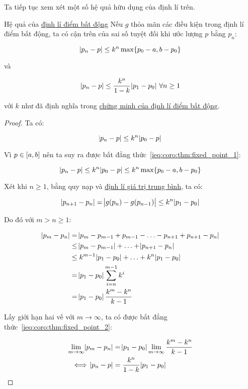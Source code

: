 \documentclass[../../Lectures]{subfiles}
\begin{document}
Ta tiếp tục xem xét một số hệ quả hữu dụng của định lí trên.

\begin{ccoro}{Hệ quả của \hyperref[thm:fixed_point]{định lí điểm bất động}}{}
    Nếu \(g\) thỏa mãn các điều kiện trong định lí điểm bất động, ta có cận trên
    của sai số tuyệt đối khi ước lượng \(p\) bằng \(p_n\):

    \begin{equation}\label{ieq:coro:thm:fixed_point_1}
        \abs{p_n - p} \leq k^n \max \{p_0 - a, b - p_0\}
    \end{equation}

    và

    \begin{equation}\label{ieq:coro:thm:fixed_point_2}
        \abs{p_n - p} \leq \frac{k^n}{1 - k} \abs{p_1 - p_0} \, \forall n \geq 1
    \end{equation}

    với \(k\) như đã định nghĩa trong \hyperref[proof:thm:fixed_point]{chứng
    minh của định lí điểm bất động}.
\end{ccoro}

\begin{proof}
    Ta có:

    \[\abs{p_n - p} \leq k^n \abs{p_0 - p}\]

    Vì \(p \in \interval{a}{b}\) nên ta suy ra được bất đẳng
    thức~\ref{ieq:coro:thm:fixed_point_1}:

    \[\abs{p_n - p} \leq k^n \abs{p_0 - p} \leq k^n \max \{p_0 - a, b - p_0\}\]

    Xét khi \(n \geq 1\), bằng quy nạp và
    \hyperref[thm:mean_value_theorem]{định lí giá trị trung bình}, ta có:

    \[\abs{p_{n + 1} - p_n} = \abs{g(p_n) - g(p_{n - 1})} \leq k^n \abs{p_1 - p_0}\]

    Do đó với \(m > n \geq 1\):

    \begin{align*}
        \abs{p_m - p_n} & = \abs{p_m - p_{m - 1} + p_{m - 1} - \ldots - p_{n + 1} + p_{n + 1} - p_n} \\
                        & \leq \abs{p_m - p_{m - 1}} + \ldots + \abs{p_{n + 1} - p_n}                \\
                        & \leq k^{m - 1} \abs{p_1 - p_0} + \ldots + k^n \abs{p_1 - p_0}              \\
                        & = \abs{p_1 - p_0} \sum_{i = n}^{m - 1} k^i                                 \\
                        & = \abs{p_1 - p_0} \frac{k^m - k^n}{k - 1}
    \end{align*}

    Lấy giới hạn hai vế với \(m \to \infty\), ta có được bất đẳng
    thức~\ref{ieq:coro:thm:fixed_point_2}:

    \begin{align*}
        \lim_{m \to \infty} \abs{p_m - p_n} & = \abs{p_1 - p_0} \lim_{m \to \infty} \frac{k^m - k^n}{k - 1} \\
        \iff                  \abs{p_n - p} & = \frac{k^n}{1 - k} \abs{p_1 - p_0}
    \end{align*}
\end{proof}
\end{document}
